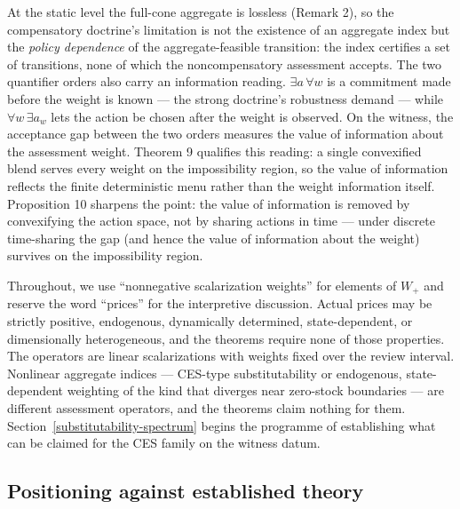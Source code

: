 \documentclass[3p,11pt]{elsarticle}
\begin{document}
At the static level the full-cone aggregate is lossless (Remark 2), so the compensatory doctrine's limitation is not the existence of an aggregate index but the \emph{policy dependence} of the aggregate-feasible transition: the index certifies a set of transitions, none of which the noncompensatory assessment accepts. The two
quantifier orders also carry an information reading.
\(\exists a\, \forall w\) is a commitment made before the weight is
known --- the strong doctrine's robustness demand --- while
\(\forall w\, \exists a_w\) lets the action be chosen after the weight
is observed. On the witness, the acceptance gap between the two orders
measures the value of information about the assessment weight. Theorem 9 qualifies this reading: a single convexified blend serves every weight on the impossibility region, so the value of information reflects the finite deterministic menu rather than the weight information itself. Proposition 10 sharpens the point: the value of information is removed by convexifying the action space, not by sharing actions in time --- under discrete time-sharing the gap (and
hence the value of information about the weight) survives on the
impossibility region.

Throughout, we use ``nonnegative scalarization weights'' for elements of
\(W_+\) and reserve the word ``prices'' for the interpretive discussion.
Actual prices may be strictly positive, endogenous,
dynamically determined, state-dependent, or dimensionally heterogeneous,
and the theorems require none of those properties. The operators are
linear scalarizations with weights fixed over the review interval.
Nonlinear aggregate indices --- CES-type substitutability or endogenous,
state-dependent weighting of the kind that diverges near zero-stock
boundaries --- are different assessment operators, and the theorems
claim nothing for them. Section~\ref{substitutability-spectrum} begins the
programme of establishing what can be claimed for the CES family on the
witness datum.

\subsection{Positioning against established
theory}\label{positioning-against-established-theory}
\end{document}
